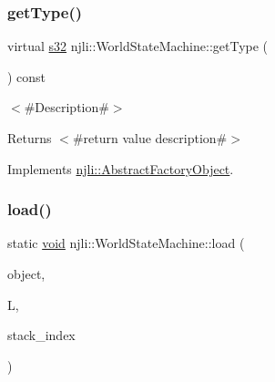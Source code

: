 \mbox{\label{classnjli_1_1_world_state_machine_ab2179e3368a673e88709790a0a6e4bc3}} 
\subsubsection{\texorpdfstring{get\+Type()}{getType()}}
{\footnotesize\ttfamily virtual \mbox{\hyperlink{_util_8h_aa62c75d314a0d1f37f79c4b73b2292e2}{s32}} njli\+::\+World\+State\+Machine\+::get\+Type (\begin{DoxyParamCaption}{ }\end{DoxyParamCaption}) const\hspace{0.3cm}{\ttfamily [virtual]}}

$<$\#\+Description\#$>$

\begin{DoxyReturn}{Returns}
$<$\#return value description\#$>$ 
\end{DoxyReturn}


Implements \mbox{\hyperlink{classnjli_1_1_abstract_factory_object_a207c86146d40d0794708ae7f2d4e60a7}{njli\+::\+Abstract\+Factory\+Object}}.

\mbox{\label{classnjli_1_1_world_state_machine_a7d998f8840f82b74deaa564aa89d7d44}} 
\subsubsection{\texorpdfstring{load()}{load()}}
{\footnotesize\ttfamily static \mbox{\hyperlink{_thread_8h_af1e856da2e658414cb2456cb6f7ebc66}{void}} njli\+::\+World\+State\+Machine\+::load (\begin{DoxyParamCaption}\item[{\mbox{\hyperlink{classnjli_1_1_world_state_machine}{World\+State\+Machine}} \&}]{object,  }\item[{lua\+\_\+\+State $\ast$}]{L,  }\item[{int}]{stack\+\_\+index }\end{DoxyParamCaption})\hspace{0.3cm}{\ttfamily [static]}}

